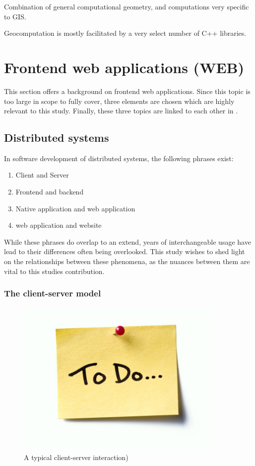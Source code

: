 Combination of general computational geometry, and computations very specific to GIS.

Geocomputation is mostly facilitated by a very select number of C++ libraries. 


\section{Frontend web applications (WEB) }
\label{sec:background-web}

This section offers a background on frontend web applications.
Since this topic is too large in scope to fully cover, three elements are chosen which are highly relevant to this study.
Finally, these three topics are linked to each other in .

\subsection{Distributed systems}
\label{sec:background-web-terminology}

In software development of distributed systems, the following phrases exist: 
\begin{enumerate}[-]
  \item Client and Server 
  \item Frontend and backend
  \item Native application and web application
  \item web application and website
\end{enumerate}
While these phrases do overlap to an extend, years of interchangeable usage have lead to their differences often being overlooked. 
This study wishes to shed light on the relationships between these phenomena, as the nuances between them are vital to this studies contribution.

\subsubsection*{The client-server model}

\begin{figure}
  \centering
  \graphicspath{ {../../assets/images/misc/} }
  \includegraphics[width=380px]{todo.jpg}
  \caption{A typical client-server interaction) }
  \label{fig:client-server}
\end{figure}

